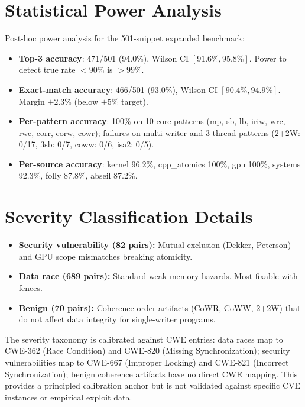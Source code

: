 \documentclass[11pt]{article}
\begin{document}
\section{Statistical Power Analysis}
\label{app:power-analysis}

Post-hoc power analysis for the 501-snippet expanded benchmark:
\begin{itemize}[nosep]
\item \textbf{Top-3 accuracy}: 471/501 (94.0\%), Wilson CI $[91.6\%, 95.8\%]$.
  Power to detect true rate $<90\%$ is $>99\%$.
\item \textbf{Exact-match accuracy}: 466/501 (93.0\%), Wilson CI $[90.4\%, 94.9\%]$.
  Margin $\pm 2.3\%$ (below $\pm 5\%$ target).
\item \textbf{Per-pattern accuracy}: 100\% on 10 core patterns (mp, sb, lb,
  iriw, wrc, rwc, corr, corw, cowr); failures on multi-writer and 3-thread
  patterns (2+2W: 0/17, 3sb: 0/7, coww: 0/6, isa2: 0/5).
\item \textbf{Per-source accuracy}: kernel 96.2\%, cpp\_atomics 100\%,
  gpu 100\%, systems 92.3\%, folly 87.8\%, abseil 87.2\%.
\end{itemize}

\section{Severity Classification Details}
\label{app:severity-details}

\begin{itemize}[nosep]
\item \textbf{Security vulnerability (82 pairs):} Mutual exclusion
  (Dekker, Peterson) and GPU scope mismatches breaking atomicity.
\item \textbf{Data race (689 pairs):} Standard weak-memory hazards.
  Most fixable with fences.
\item \textbf{Benign (70 pairs):} Coherence-order artifacts (CoWR, CoWW, 2+2W)
  that do not affect data integrity for single-writer programs.
\end{itemize}

\noindent
The severity taxonomy is calibrated against CWE entries:
data races map to CWE-362 (Race Condition) and CWE-820
(Missing Synchronization); security vulnerabilities map to
CWE-667 (Improper Locking) and CWE-821 (Incorrect Synchronization);
benign coherence artifacts have no direct CWE mapping.
This provides a principled calibration anchor but is not validated
against specific CVE instances or empirical exploit data.
\end{document}

